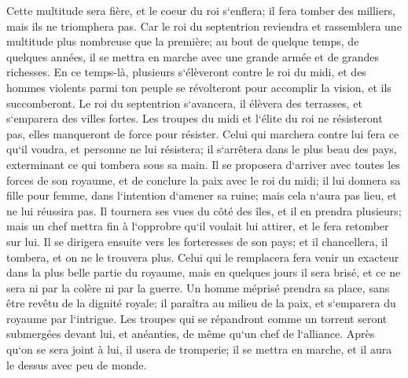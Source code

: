 \verse Cette multitude sera fière, et le coeur du roi s`enflera; il fera tomber des milliers, mais ils ne triomphera pas. 
\verse Car le roi du septentrion reviendra et rassemblera une multitude plus nombreuse que la première; au bout de quelque temps, de quelques années, il se mettra en marche avec une grande armée et de grandes richesses. 
\verse En ce temps-là, plusieurs s`élèveront contre le roi du midi, et des hommes violents parmi ton peuple se révolteront pour accomplir la vision, et ils succomberont. 
\verse Le roi du septentrion s`avancera, il élèvera des terrasses, et s`emparera des villes fortes. Les troupes du midi et l`élite du roi ne résisteront pas, elles manqueront de force pour résister. 
\verse Celui qui marchera contre lui fera ce qu`il voudra, et personne ne lui résistera; il s`arrêtera dans le plus beau des pays, exterminant ce qui tombera sous sa main. 
\verse Il se proposera d`arriver avec toutes les forces de son royaume, et de conclure la paix avec le roi du midi; il lui donnera sa fille pour femme, dans l`intention d`amener sa ruine; mais cela n`aura pas lieu, et ne lui réussira pas. 
\verse Il tournera ses vues du côté des îles, et il en prendra plusieurs; mais un chef mettra fin à l`opprobre qu`il voulait lui attirer, et le fera retomber sur lui. 
\verse Il se dirigera ensuite vers les forteresses de son pays; et il chancellera, il tombera, et on ne le trouvera plus. 
\verse Celui qui le remplacera fera venir un exacteur dans la plus belle partie du royaume, mais en quelques jours il sera brisé, et ce ne sera ni par la colère ni par la guerre. 
\verse Un homme méprisé prendra sa place, sans être revêtu de la dignité royale; il paraîtra au milieu de la paix, et s`emparera du royaume par l`intrigue. 
\verse Les troupes qui se répandront comme un torrent seront submergées devant lui, et anéanties, de même qu`un chef de l`alliance. 
\verse Après qu`on se sera joint à lui, il usera de tromperie; il se mettra en marche, et il aura le dessus avec peu de monde. 
